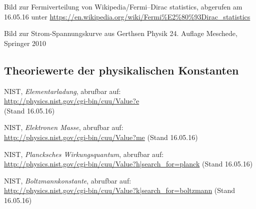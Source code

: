 Bild zur Fermiverteilung von Wikipedia/Fermi–Dirac statistics, abgerufen am 16.05.16 unter \url{https://en.wikipedia.org/wiki/Fermi%E2%80%93Dirac_statistics}\par

Bild zur Strom-Spannungskurve aus Gerthsen Physik 24. Auflage Meschede, Springer 2010\par


\subsection{Theoriewerte der physikalischen Konstanten}
\label{sub:theoriewerte_der_physikalischen_konstanten}


NIST, \emph{Elementarladung}, abrufbar auf:\\
\url{http://physics.nist.gov/cgi-bin/cuu/Value?e}\\
(Stand 16.05.16)\par

NIST, \emph{Elektronen Masse}, abrufbar auf:\\
\url{http://physics.nist.gov/cgi-bin/cuu/Value?me}
(Stand 16.05.16)\par

NIST, \emph{Plancksches Wirkungsquantum}, abrufbar auf:\\
\url{http://physics.nist.gov/cgi-bin/cuu/Value?h|search_for=planck}
(Stand 16.05.16)\par

NIST, \emph{Boltzmannkonstante}, abrufbar auf:\\
\url{http://physics.nist.gov/cgi-bin/cuu/Value?k|search_for=boltzmann}
(Stand 16.05.16)\par

